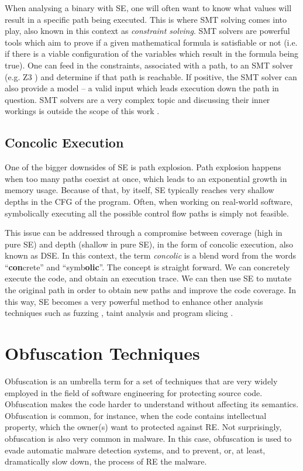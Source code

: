 When analysing a binary with \gls{SE}, one will often want to know what values will result in a specific path being executed. This is where \gls{SMT} \cite{smt} solving comes into play, also known in this context as \emph{constraint solving}. \gls{SMT} solvers are powerful tools which aim to prove if a given mathematical formula is satisfiable or not (i.e. if there is a viable configuration of the variables which result in the formula being true). One can feed in the constraints, associated with a path, to an \gls{SMT} solver (e.g. Z3 \cite{z3}) and determine if that path is reachable. If positive, the \gls{SMT} solver can also provide a model -- a valid input which leads execution down the path in question. \gls{SMT} solvers are a very complex topic and discussing their inner workings is outside the scope of this work \cite{all_about_taint_2010}. 

\subsection{Concolic Execution}

One of the bigger downsides of \gls{SE} is path explosion. Path explosion happens when too many paths coexist at once, which leads to an exponential growth in memory usage. Because of that, by itself, \gls{SE} typically reaches very shallow depths in the \gls{CFG} of the program. Often, when working on real-world software, symbolically executing all the possible control flow paths is simply not feasible.

This issue can be addressed through a compromise between coverage (high in pure \gls{SE}) and depth (shallow in pure \gls{SE}), in the form of concolic execution, also known as \gls{DSE}. In this context, the term \emph{concolic} is a blend word from the words ``\textbf{con}crete'' and ``symb\textbf{olic}''. The concept is straight forward. We can concretely execute the code, and obtain an execution trace. We can then use \gls{SE} to mutate the original path in order to obtain new paths and improve the code coverage. In this way, \gls{SE} becomes a very powerful method to enhance other analysis techniques such as fuzzing \cite{fuzzing}, taint analysis and program slicing \cite{survey_symbolic_2018}.

\section{Obfuscation Techniques}
\label{sec:obfuscation}

Obfuscation is an umbrella term for a set of techniques that are very widely employed in the field of software engineering for protecting source code. Obfuscation makes the code harder to understand without affecting its semantics. Obfuscation is common, for instance, when the code contains intellectual property, which the owner(s) want to protected against \gls{RE}. Not surprisingly, obfuscation is also very common in malware. In this case, obfuscation is used to evade automatic malware detection systems, and to prevent, or, at least, dramatically slow down, the process of \gls{RE} the malware.

